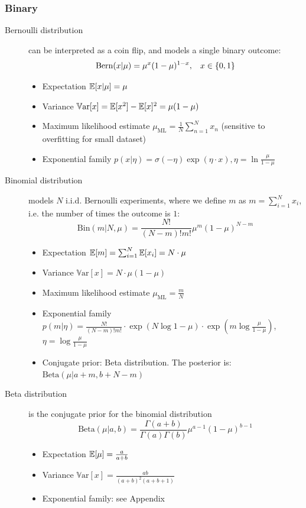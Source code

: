 \subsubsection{Binary}
\begin{description}
	\item[Bernoulli distribution] can be interpreted as a coin flip, and models a single binary outcome:
	$$\text{Bern}(x|\mu)=\mu^{x}(1-\mu)^{1-x}, \hspace{3mm}x\in\{0,1\}$$
	\begin{itemize}
		\item Expectation $\mathbb{E}[x|\mu]=\mu$
		\item Variance $\mathbb{V}\text{ar}[x]=\mathbb{E}[x^2]-\mathbb{E}[x]^2=\mu(1-\mu)$
		\item Maximum likelihood estimate $\mu_{\text{ML}}=\frac{1}{N}\sum_{n=1}^{N} x_n$ (sensitive to overfitting for small dataset)
		\item Exponential family $p(x|\eta)=\sigma(-\eta)\exp(\eta\cdot x), \eta=\ln \frac{\mu}{1-\mu}$
	\end{itemize}

	\item[Binomial distribution] models $N$ i.i.d. Bernoulli experiments, where we define $m$ as $m=\sum_{i=1}^{N}x_i$, i.e. the number of times the outcome is $1$:
	$$\text{Bin}(m|N,\mu)=\frac{N!}{(N-m)!m!}\mu^{m}(1 - \mu)^{N-m}$$	
	\begin{itemize}
		\item Expectation $\mathbb{E}[m]=\sum_{i=1}^{N}\mathbb{E}[x_i]=N\cdot \mu$
		\item Variance $\mathbb{V}\text{ar}[x]=N\cdot \mu(1-\mu)$
		\item Maximum likelihood estimate $\mu_{\text{ML}}=\frac{m}{N}$
		\item Exponential family $p(m|\eta)=\frac{N!}{(N-m)!m!}\cdot \exp(N \log 1-\mu) \cdot \exp(m\log\frac{\mu}{1-\mu})$, $\eta=\log \frac{\mu}{1-\mu}$
		\item Conjugate prior: Beta distribution. The posterior is: $\text{Beta}(\mu|a+m,b+N-m)$
	\end{itemize}

	\item[Beta distribution] is the conjugate prior for the binomial distribution
	$$\text{Beta}(\mu|a,b)=\frac{\Gamma(a+b)}{\Gamma(a)\Gamma(b)}\mu^{a-1}(1-\mu)^{b-1}$$
	\begin{itemize}
		\item Expectation $\mathbb{E}[\mu]=\frac{a}{a+b}$
		\item Variance $\mathbb{V}\text{ar}[x]=\frac{ab}{(a+b)^2(a+b+1)}$
		\item Exponential family: see Appendix
	\end{itemize}
\end{description}
